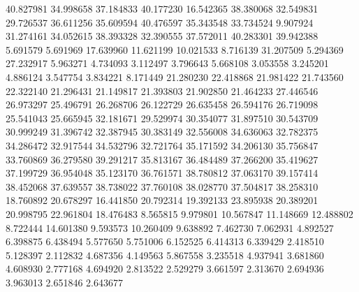 40.827981
34.998658
37.184833
40.177230
16.542365
38.380068
32.549831
29.726537
36.611256
35.609594
40.476597
35.343548
33.734524
9.907924
31.274161
34.052615
38.393328
32.390555
37.572011
40.283301
39.942388
5.691579
5.691969
17.639960
11.621199
10.021533
8.716139
31.207509
5.294369
27.232917
5.963271
4.734093
3.112497
3.796643
5.668108
3.053558
3.245201
4.886124
3.547754
3.834221
8.171449
21.280230
22.418868
21.981422
21.743560
22.322140
21.296431
21.149817
21.393803
21.902850
21.464233
27.446546
26.973297
25.496791
26.268706
26.122729
26.635458
26.594176
26.719098
25.541043
25.665945
32.181671
29.529974
30.354077
31.897510
30.543709
30.999249
31.396742
32.387945
30.383149
32.556008
34.636063
32.782375
34.286472
32.917544
34.532796
32.721764
35.171592
34.206130
35.756847
33.760869
36.279580
39.291217
35.813167
36.484489
37.266200
35.419627
37.199729
36.954048
35.123170
36.761571
38.780812
37.063170
39.157414
38.452068
37.639557
38.738022
37.760108
38.028770
37.504817
38.258310
18.760892
20.678297
16.441850
20.792314
19.392133
23.895938
20.389201
20.998795
22.961804
18.476483
8.565815
9.979801
10.567847
11.148669
12.488802
8.722444
14.601380
9.593573
10.260409
9.638892
7.462730
7.062931
4.892527
6.398875
6.438494
5.577650
5.751006
6.152525
6.414313
6.339429
2.418510
5.128397
2.112832
4.687356
4.149563
5.867558
3.235518
4.937941
3.681860
4.608930
2.777168
4.694920
2.813522
2.529279
3.661597
2.313670
2.694936
3.963013
2.651846
2.643677
